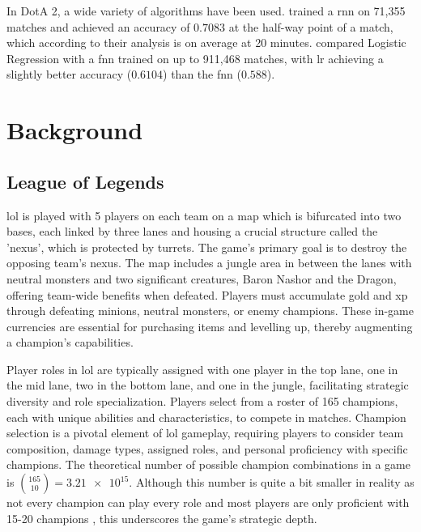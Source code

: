 \documentclass[12pt, a4paper, headinclude, twoside, plainheadsepline, open=right, numbers=noenddot, hidelinks, toc=listof, toc=bibliography]{scrreprt}
\begin{document}
In DotA 2, a wide variety of algorithms have been used.  
 \cite{yuMOBASliceTimeSlice2018} trained a \ac{rnn} on 71,355 matches and achieved an accuracy of $0.7083$ at the half-way point of a match, which according to their analysis is on average at 20 minutes.
 \cite{wangPredictingMultiplayerOnline2016} compared Logistic Regression with a \ac{fnn} trained on up to 911,468 matches, with \ac{lr} achieving a slightly better accuracy ($0.6104$) than the \ac{fnn} ($0.588$).


\chapter{Background}
\label{chap:background}

\section{League of Legends}
\label{sec:LoL}

\Ac{lol} is played with 5 players on each team on a map which is bifurcated into two bases, each linked by three lanes and housing a crucial structure called the 'nexus', which is protected by turrets. 
The game's primary goal is to destroy the opposing team's nexus.
The map includes a jungle area in between the lanes with neutral monsters and two significant creatures, Baron Nashor and the Dragon, offering team-wide benefits when defeated.
Players must accumulate gold and \ac{xp} through defeating minions, neutral monsters, or enemy champions. 
These in-game currencies are essential for purchasing items and levelling up, thereby augmenting a champion's capabilities.

Player roles in \ac{lol} are typically assigned with one player in the top lane, one in the mid lane, two in the bottom lane, and one in the jungle, facilitating strategic diversity and role specialization.
Players select from a roster of 165 champions, each with unique abilities and characteristics, to compete in matches.
Champion selection is a pivotal element of \ac{lol} gameplay, requiring players to consider team composition, damage types, assigned roles, and personal proficiency with specific champions. 
The theoretical number of possible champion combinations in a game is $\binom{165}{10} = \num{3.21e15}$.
Although this number is quite a bit smaller in reality as not every champion can play every role and most players are only proficient with 15-20 champions \cite{2022Recap}, this underscores the game's strategic depth.
\end{document}
